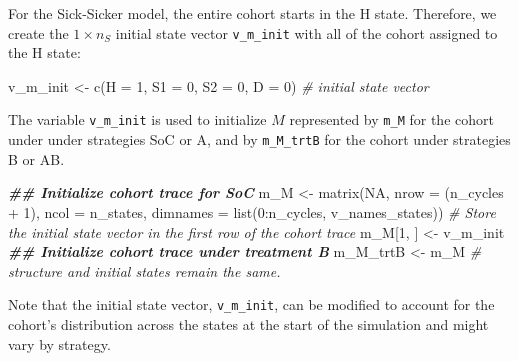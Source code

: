 \documentclass[
]{article}
\newenvironment{Shaded}{\begin{snugshade}}{\end{snugshade}}
\newcommand{\AttributeTok}[1]{\textcolor[rgb]{0.77,0.63,0.00}{#1}}
\newcommand{\CommentTok}[1]{\textcolor[rgb]{0.56,0.35,0.01}{\textit{#1}}}
\newcommand{\ConstantTok}[1]{\textcolor[rgb]{0.00,0.00,0.00}{#1}}
\newcommand{\DecValTok}[1]{\textcolor[rgb]{0.00,0.00,0.81}{#1}}
\newcommand{\DocumentationTok}[1]{\textcolor[rgb]{0.56,0.35,0.01}{\textbf{\textit{#1}}}}
\newcommand{\FunctionTok}[1]{\textcolor[rgb]{0.00,0.00,0.00}{#1}}
\newcommand{\NormalTok}[1]{#1}
\newcommand{\OtherTok}[1]{\textcolor[rgb]{0.56,0.35,0.01}{#1}}
\newcommand{\SpecialCharTok}[1]{\textcolor[rgb]{0.00,0.00,0.00}{#1}}
\begin{document}
For the Sick-Sicker model, the entire cohort starts in the H state. Therefore, we create the \(1 \times n_S\) initial state vector \texttt{v\_m\_init} with all of the cohort assigned to the H state:

\begin{Shaded}
\begin{Highlighting}[]
\NormalTok{v\_m\_init }\OtherTok{\textless{}{-}} \FunctionTok{c}\NormalTok{(}\AttributeTok{H =} \DecValTok{1}\NormalTok{, }\AttributeTok{S1 =} \DecValTok{0}\NormalTok{, }\AttributeTok{S2 =} \DecValTok{0}\NormalTok{, }\AttributeTok{D =} \DecValTok{0}\NormalTok{) }\CommentTok{\# initial state vector}
\end{Highlighting}
\end{Shaded}

The variable \texttt{v\_m\_init} is used to initialize \(M\) represented by \texttt{m\_M} for the cohort under under strategies SoC or A, and by \texttt{m\_M\_trtB} for the cohort under strategies B or AB.

\begin{Shaded}
\begin{Highlighting}[]
\DocumentationTok{\#\# Initialize cohort trace for SoC}
\NormalTok{m\_M }\OtherTok{\textless{}{-}} \FunctionTok{matrix}\NormalTok{(}\ConstantTok{NA}\NormalTok{, }
              \AttributeTok{nrow =}\NormalTok{ (n\_cycles }\SpecialCharTok{+} \DecValTok{1}\NormalTok{), }\AttributeTok{ncol =}\NormalTok{ n\_states, }
              \AttributeTok{dimnames =} \FunctionTok{list}\NormalTok{(}\DecValTok{0}\SpecialCharTok{:}\NormalTok{n\_cycles, v\_names\_states))}
\CommentTok{\# Store the initial state vector in the first row of the cohort trace}
\NormalTok{m\_M[}\DecValTok{1}\NormalTok{, ] }\OtherTok{\textless{}{-}}\NormalTok{ v\_m\_init}
\DocumentationTok{\#\# Initialize cohort trace under treatment B}
\NormalTok{m\_M\_trtB }\OtherTok{\textless{}{-}}\NormalTok{ m\_M }\CommentTok{\# structure and initial states remain the same.}
\end{Highlighting}
\end{Shaded}

Note that the initial state vector, \texttt{v\_m\_init}, can be modified to account for the cohort's distribution across the states at the start of the simulation and might vary by strategy.
\end{document}
